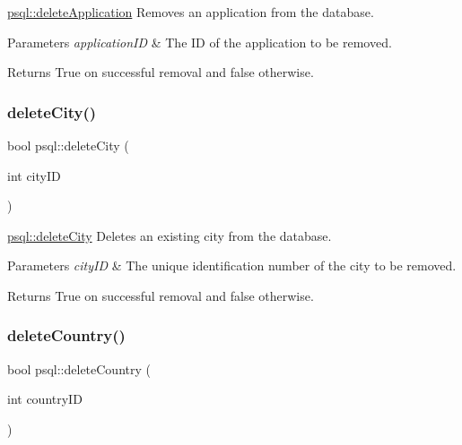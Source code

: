 \hyperlink{classpsql_a999ee8e2d813892411ef502ebc055a79}{psql\+::delete\+Application} Removes an application from the database. 


\begin{DoxyParams}{Parameters}
{\em application\+ID} & The ID of the application to be removed. \\
\hline
\end{DoxyParams}
\begin{DoxyReturn}{Returns}
True on successful removal and false otherwise. 
\end{DoxyReturn}
\mbox{\label{classpsql_aaffd42b26b635d9881daaf5fbf4fd62f}} 
\subsubsection{\texorpdfstring{delete\+City()}{deleteCity()}}
{\footnotesize\ttfamily bool psql\+::delete\+City (\begin{DoxyParamCaption}\item[{int}]{city\+ID }\end{DoxyParamCaption})}



\hyperlink{classpsql_aaffd42b26b635d9881daaf5fbf4fd62f}{psql\+::delete\+City} Deletes an existing city from the database. 


\begin{DoxyParams}{Parameters}
{\em city\+ID} & The unique identification number of the city to be removed. \\
\hline
\end{DoxyParams}
\begin{DoxyReturn}{Returns}
True on successful removal and false otherwise. 
\end{DoxyReturn}
\mbox{\label{classpsql_a914bf8701fbed4ff80edcd0d09c7c3fd}} 
\subsubsection{\texorpdfstring{delete\+Country()}{deleteCountry()}}
{\footnotesize\ttfamily bool psql\+::delete\+Country (\begin{DoxyParamCaption}\item[{int}]{country\+ID }\end{DoxyParamCaption})}



